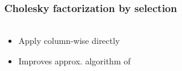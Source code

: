\documentclass{beamer}                             %
\begin{document}
\begingroup
\let\oldfootnoterule\footnoterule
\renewcommand\footnoterule{\only<3->\oldfootnoterule}
\begin{frame}
\frametitle{Cholesky factorization by selection}
\framesubtitle{}

\begin{columns}
  \begin{column}{0.6\textwidth}
    \begin{itemize}
      \item<+-> Apply column-wise directly

      \item<+-> Improves approx. algorithm of \footnotemark
    \end{itemize}
  \end{column}
  \begin{column}{0.4\textwidth}
    \begin{figure}[h!]
      \centering
    \end{figure}

    \vspace{-0.5cm}


\end{column}
\end{columns}
\end{frame}
\end{document}
